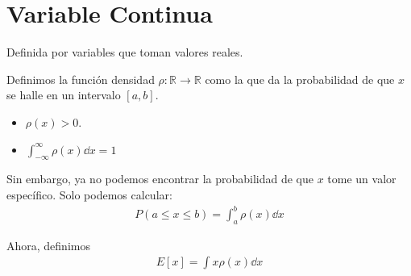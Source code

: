 \documentclass{./Probabilidad.tex}
\begin{document}
\chapter{Variable Continua}
Definida por variables que toman valores reales.
\begin{defin}
	Definimos la función densidad $\rho: \mathbb{R} \to \mathbb{R}$ como la que da la probabilidad de que $x$ se halle en un intervalo $[a,b]$.
	\begin{itemize}
		\item $\rho(x)> 0$.
		\item $\int_{-\infty}^{\infty} \rho(x)\dd{x} = 1$ 
	\end{itemize}
	Sin embargo, ya no podemos encontrar la probabilidad de que $x$ tome un valor específico. Solo podemos calcular:
	\begin{equation}
		\begin{split}
			P(a \leq x \leq b) = \int_{a}^{b} \rho(x) \dd{x}
		\end{split}
	\end{equation}
\end{defin}
Ahora, definimos
\begin{equation}
	\begin{split}
		E[x] = \int x \rho(x) \dd{x}
	\end{split}
\end{equation}
\end{document}
